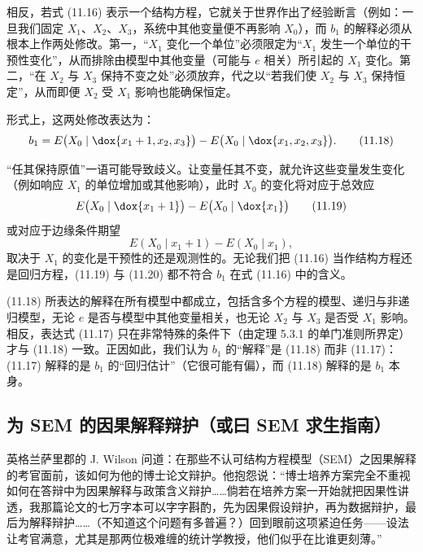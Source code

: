 相反，若式 \textup{(11.16)} 表示一个结构方程，它就关于世界作出了经验断言（例如：一旦我们固定 $X_1$、$X_2$、$X_3$，系统中其他变量便不再影响 $X_0$），而 $b_1$ 的解释必须从根本上作两处修改。第一，“$X_1$ 变化一个单位”必须限定为“$X_1$ 发生一个单位的干预性变化”，从而排除由模型中其他变量（可能与 $e$ 相关）所引起的 $X_1$ 变化。第二，“在 $X_2$ 与 $X_3$ 保持不变之处”必须放弃，代之以“若我们使 $X_2$ 与 $X_3$ 保持恒定”，从而即便 $X_2$ 受 $X_1$ 影响也能确保恒定。

形式上，这两处修改表达为：
\begin{equation}
b_1=E\bigl(X_0\mid\dox{x_1+1,x_2,x_3}\bigr)-E\bigl(X_0\mid\dox{x_1,x_2,x_3}\bigr). \tag{11.18}
\end{equation}

“任其保持原值”一语可能导致歧义。让变量任其不变，就允许这些变量发生变化（例如响应 $X_1$ 的单位增加或其他影响），此时 $X_0$ 的变化将对应于总效应
\begin{equation}
E\bigl(X_0\mid\dox{x_1+1}\bigr)-E\bigl(X_0\mid\dox{x_1}\bigr) \tag{11.19}
\end{equation}
或对应于边缘条件期望
\begin{equation}
E(X_0\mid x_1+1)-E(X_0\mid x_1), \tag{11.20}
\end{equation}
取决于 $X_1$ 的变化是干预性的还是观测性的。无论我们把 \textup{(11.16)} 当作结构方程还是回归方程，\textup{(11.19)} 与 \textup{(11.20)} 都不符合 $b_1$ 在式 \textup{(11.16)} 中的含义。

\textup{(11.18)} 所表达的解释在所有模型中都成立，包括含多个方程的模型、递归与非递归模型，无论 $e$ 是否与模型中其他变量相关，也无论 $X_2$ 与 $X_3$ 是否受 $X_1$ 影响。相反，表达式 \textup{(11.17)} 只在非常特殊的条件下（由定理 5.3.1 的单门准则所界定）才与 \textup{(11.18)} 一致。正因如此，我们认为 $b_1$ 的“解释”是 \textup{(11.18)} 而非 \textup{(11.17)}：\textup{(11.17)} 解释的是 $b_1$ 的“回归估计”（它很可能有偏），而 \textup{(11.18)} 解释的是 $b_1$ 本身。

\subsection{为 SEM 的因果解释辩护（或曰 SEM 求生指南）}


英格兰萨里郡的 J. Wilson 问道：在那些不认可结构方程模型（SEM）之因果解释的考官面前，该如何为他的博士论文辩护。他抱怨说：“博士培养方案完全不重视如何在答辩中为因果解释与政策含义辩护……倘若在培养方案一开始就把因果性讲透，我那篇论文的七万字本可以字字斟酌，先为因果假设辩护，再为数据辩护，最后为解释辩护……（不知道这个问题有多普遍？）回到眼前这项紧迫任务——设法让考官满意，尤其是那两位极难缠的统计学教授，他们似乎在比谁更刻薄。”


